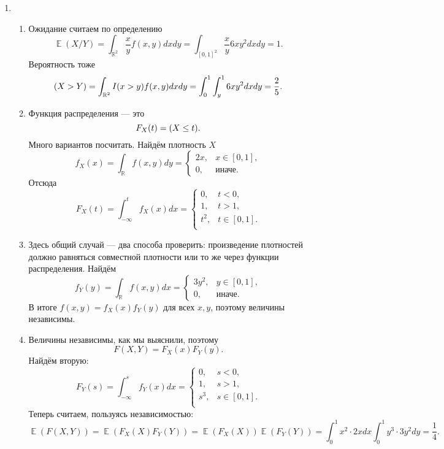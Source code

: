 \documentclass[12pt]{article}
\let\P\relax
\DeclareMathOperator{\P}{\mathbb{P}}
\DeclareMathOperator{\E}{\mathbb{E}}
\newcommand{\RR}{\mathbb{R}}
\begin{document}
\begin{enumerate}
    
    \item 

    \begin{enumerate}
        \item Ожидание считаем по определению
        \[
        \E(X/Y) = \int_{\RR^2} \frac{x}{y}f(x,y) dxdy = \int_{[0,1]^2} \frac{x}{y} 6xy^2 dxdy = 1.
        \]
        Вероятность тоже
        \[
        \P(X > Y) = \int_{\RR^2} I(x>y)f(x,y) dxdy = \int_0^1 \int_y^1  6xy^2 dx dy = \frac{2}{5}.
        \]
        \item Функция распределения — это
        \[
        F_X(t) = \P(X \leq t).
        \]
        Много вариантов посчитать. Найдём плотность $X$
        \[
        f_X(x) = \int_{\RR} f(x,y)dy = \begin{cases} 2x, & x \in [0,1],\\ 0, & \text{иначе}. \end{cases}
        \]
        Отсюда
        \[
        F_X(t) = \int_{-\infty}^t f_X(x) dx = \begin{cases} 0, & t<0,\\ 1, & t>1,\\ t^2, & t \in [0,1].\\   \end{cases}
        \]
        \item Здесь общий случай — два способа проверить: произведение плотностей должно равняться совместной плотности или то же через функции распределения. Найдём
        \[
        f_Y(y) = \int_{\RR} f(x,y)dx = \begin{cases} 3y^2, & y \in [0,1],\\ 0, & \text{иначе}. \end{cases}
        \]
        В итоге $f(x,y)=f_X(x)f_Y(y)$ для всех $x,y$, поэтому величины независимы.
        
        \item  Величины независимы, как мы выяснили, поэтому
        \[
        F(X,Y) = F_X(x)F_Y(y).
        \]
        Найдём вторую:
        \[
        F_Y(s) = \int_{-\infty}^s f_Y(x) dx = \begin{cases} 0, & s<0,\\ 1, & s>1,\\ s^3, & s \in [0,1].\\   \end{cases}
        \]
        Теперь считаем, пользуясь независимостью:
        \[
        \E(F(X,Y)) =\E(F_X(X) F_Y(Y)) = \E(F_X(X)) \E(F_Y(Y)) = \int_0^1 x^2 \cdot 2x dx \int_0^1 y^3 \cdot 3y^2 dy = \frac{1}{4}.
        \]
    \end{enumerate}
    


\end{enumerate}
\end{document}
